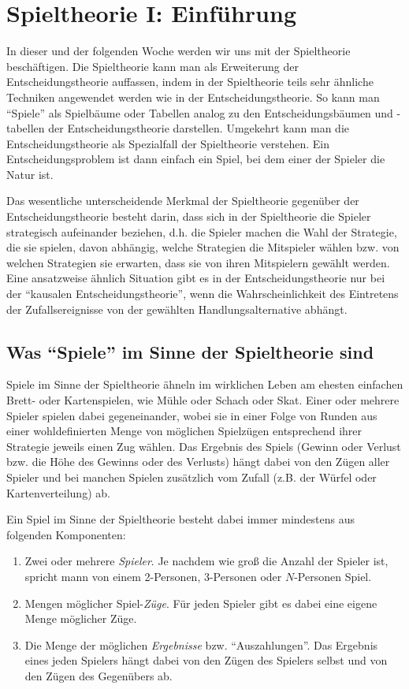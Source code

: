 \section{Spieltheorie I: Einführung}

In dieser und der folgenden Woche werden wir uns mit der Spieltheorie
beschäftigen. Die Spieltheorie kann man als Erweiterung der
Entscheidungstheorie auffassen, indem in der Spieltheorie teils sehr ähnliche
Techniken angewendet werden wie in der Entscheidungstheorie. So kann man
"`Spiele"' als Spielbäume oder Tabellen analog zu den Entscheidungsbäumen und
-tabellen der Entscheidungstheorie darstellen. Umgekehrt kann man die
Entscheidungstheorie als Spezialfall der Spieltheorie verstehen. Ein
Entscheidungsproblem ist dann einfach ein Spiel, bei dem einer der Spieler die
Natur ist.

Das wesentliche unterscheidende Merkmal der Spieltheorie gegenüber der
Entscheidungstheorie besteht darin, dass sich in der Spieltheorie die Spieler
strategisch aufeinander beziehen, d.h. die Spieler machen die Wahl der
Strategie, die sie spielen, davon abhängig, welche Strategien die Mitspieler
wählen bzw. von welchen Strategien sie erwarten, dass sie von ihren Mitspielern
gewählt werden. Eine ansatzweise ähnlich Situation gibt es in der
Entscheidungstheorie nur bei der "`kausalen Entscheidungstheorie"', wenn die
Wahrscheinlichkeit des Eintretens der Zufallsereignisse von der gewählten
Handlungsalternative abhängt.

\subsection{Was "`Spiele"' im Sinne der Spieltheorie sind}

Spiele im Sinne der Spieltheorie ähneln im wirklichen Leben am ehesten
einfachen Brett- oder Kartenspielen, wie Mühle oder Schach oder Skat. Einer oder
mehrere Spieler spielen dabei gegeneinander, wobei sie in einer Folge von
Runden aus einer wohldefinierten Menge von möglichen Spielzügen entsprechend
ihrer Strategie jeweils einen Zug wählen. Das Ergebnis des Spiels (Gewinn oder
Verlust bzw. die Höhe des Gewinns oder des Verlusts) hängt dabei von den Zügen
aller Spieler und bei manchen Spielen zusätzlich vom Zufall (z.B. der Würfel
oder Kartenverteilung) ab.

Ein Spiel im Sinne der
Spieltheorie besteht dabei immer mindestens aus folgenden Komponenten: 

\begin{enumerate}
  \item Zwei oder mehrere {\em Spieler}. Je nachdem wie groß die Anzahl der
  Spieler ist, spricht mann von einem 2-Personen, 3-Personen oder $N$-Personen
  Spiel. 
  \item Mengen möglicher Spiel-{\em Züge}. Für jeden Spieler gibt es dabei eine
  eigene Menge möglicher Züge.
  \item Die Menge der möglichen {\em Ergebnisse} bzw. "`Auszahlungen"'. Das
  Ergebnis eines jeden Spielers hängt dabei von den Zügen des Spielers selbst
  und von den Zügen des Gegenübers ab.
\end{enumerate}

